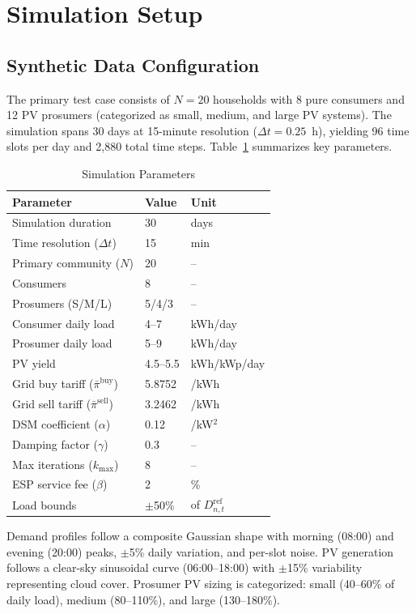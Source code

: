 \documentclass[pdflatex,sn-mathphys-num]{sn-jnl}
\newcommand{\rupee}{\text{Rs.}}
\theoremstyle{thmstyleone}
\theoremstyle{thmstyletwo}
\begin{document}
\section{Simulation Setup}\label{sec:setup}

\subsection{Synthetic Data Configuration}

The primary test case consists of $N=20$ households with 8 pure consumers and 12 PV prosumers (categorized as small, medium, and large PV systems). The simulation spans 30 days at 15-minute resolution ($\Delta t = 0.25$~h), yielding 96 time slots per day and 2,880 total time steps. Table~\ref{tab:params} summarizes key parameters.

\begin{table}[t]
\caption{Simulation Parameters}
\label{tab:params}
\centering
\begin{tabular}{lll}
\toprule
\textbf{Parameter} & \textbf{Value} & \textbf{Unit} \\
\midrule
Simulation duration & 30 & days \\
Time resolution ($\Delta t$) & 15 & min \\
Primary community ($N$) & 20 & -- \\
\quad Consumers & 8 & -- \\
\quad Prosumers (S/M/L) & 5/4/3 & -- \\
Consumer daily load & 4--7 & kWh/day \\
Prosumer daily load & 5--9 & kWh/day \\
PV yield & 4.5--5.5 & kWh/kWp/day \\
Grid buy tariff ($\bar{\pi}^{\text{buy}}$) & 5.8752 & \rupee/kWh \\
Grid sell tariff ($\bar{\pi}^{\text{sell}}$) & 3.2462 & \rupee/kWh \\
DSM coefficient ($\alpha$) & 0.12 & \rupee/kW$^2$ \\
Damping factor ($\gamma$) & 0.3 & -- \\
Max iterations ($k_{\max}$) & 8 & -- \\
ESP service fee ($\beta$) & 2 & \% \\
Load bounds & $\pm$50\% & of $D_{n,t}^{\text{ref}}$ \\
\bottomrule
\end{tabular}
\end{table}

Demand profiles follow a composite Gaussian shape with morning (08:00) and evening (20:00) peaks, $\pm$5\% daily variation, and per-slot noise. PV generation follows a clear-sky sinusoidal curve (06:00--18:00) with $\pm$15\% variability representing cloud cover. Prosumer PV sizing is categorized: small (40--60\% of daily load), medium (80--110\%), and large (130--180\%).
\end{document}
